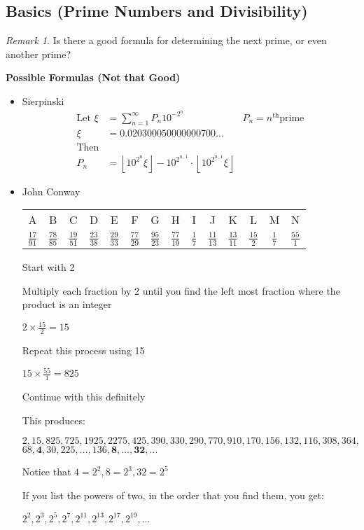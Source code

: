 \documentclass[fleqn,letterpaper,10pt,twoside]{report}
\theoremstyle{plain}
\theoremstyle{definition}
\theoremstyle{remark}
\newtheorem*{remark}{Remark}
\begin{document}
\subsection{Basics (Prime Numbers and Divisibility)}
\begin{remark}{Is there a good formula for determining the next prime, or even another prime?}

\textbf{Possible Formulas (Not that Good)}
\begin{itemize}
   \item{Sierpinski}
      \begin{align*}
         \text{Let } \xi &= \sum\limits_{n=1}^\infty P_n10^{-2^n} & P_n = n^{\text{th}} \text{prime} \\
                    \xi &= 0.020300050000000700\ldots \\
         \text{Then} \\
         P_n &= \left \lfloor{10^{2^n} \xi} \right \rfloor - 10^{2^{n_-1}} \cdot
         \left \lfloor{10^{2^{n_-1}} \xi} \right \rfloor
      \end{align*}

   \item{John Conway}
      \begin{center}
      \begin{tabular}{cccccccccccccc}
         A&B&C&D&E&F&G&H&I&J&K&L&M&N \\
         \(\frac{17}{91}\) &
         \(\frac{78}{85}\) &
         \(\frac{19}{51}\) &
         \(\frac{23}{38}\) &
         \(\frac{29}{33}\) &
         \(\frac{77}{29}\) &
         \(\frac{95}{23}\) &
         \(\frac{77}{19}\) &
         \(\frac{1 }{7 }\) &
         \(\frac{11}{13}\) &
         \(\frac{13}{11}\) &
         \(\frac{15}{2 }\) &
         \(\frac{1 }{7 }\) &
         \(\frac{55}{1 }\) \\
      \end{tabular}
      \end{center}

      Start with 2

      Multiply each fraction by 2 until you find the left most fraction where the product is an integer

      \(2 \times \frac{15}{2} = 15\)

      Repeat this process using 15

      \(15 \times \frac{55}{1} = 825\)

      Continue with this definitely

      This produces:

      \(2,15,825,725,1925,2275,425,390,330,290,770,910,170,156,132,116,308,364,\) \\
      \(68,\boldsymbol{4},30,225,\ldots,136,\boldsymbol{8},\ldots,\boldsymbol{32},\ldots\)

      Notice that \(4 = 2^2, 8 = 2^3, 32 = 2^5\)

      If you list the powers of two, in the order that you find them, you get:

      \(2^2, 2^3, 2^5, 2^7, 2^11, 2^13, 2^17, 2^19, \ldots\)

\end{itemize}
\end{remark}
\end{document}
